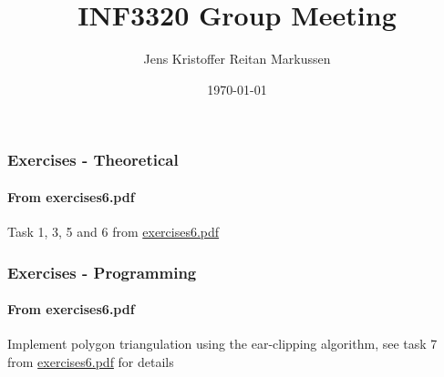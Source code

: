 \documentclass[11pt]{beamer}
\title{INF3320 Group Meeting}
\author{Jens Kristoffer Reitan Markussen}
\date{\today}
\begin{document}
	\begin{frame}
	\frametitle{Exercises - Theoretical}
	\framesubtitle{From exercises6.pdf}
	\begin{center}
	Task 1, 3, 5 and 6 from \href{https://github.com/jkrmc12/INF3320-Group-1/blob/master/doc/exercises/exercises6.pdf?raw=true}{exercises6.pdf}
	\end{center}
	\end{frame}
	
	\begin{frame}
	\frametitle{Exercises - Programming}
	\framesubtitle{From exercises6.pdf}
	\begin{center}
	Implement polygon triangulation using the ear-clipping algorithm, see task 7 from \href{https://github.com/jkrmc12/INF3320-Group-1/blob/master/doc/exercises/exercises6.pdf?raw=true}{exercises6.pdf} for details
	\end{center}
	\end{frame}
\end{document}
